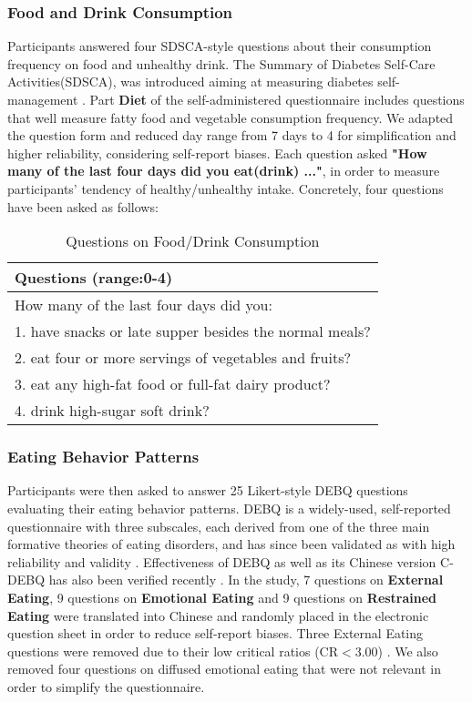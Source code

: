 \documentclass[letterpaper]{article}
\begin{document}
\subsubsection{Food and Drink Consumption}
Participants answered four SDSCA-style questions about their consumption
frequency on food and unhealthy drink. The Summary of Diabetes Self-Care
Activities(SDSCA), was introduced aiming at measuring diabetes self-management \cite{toobert2000summary}.
Part \textbf{Diet} of the self-administered questionnaire includes questions that well measure fatty food and vegetable consumption frequency.
We adapted the question form and reduced day range from 7 days to 4 for simplification and higher reliability, considering self-report biases.
Each question asked \textbf{"How many of the last four days did you eat(drink) ..."}, in order to measure participants' 
tendency of healthy/unhealthy intake. Concretely, four questions have been asked as follows:
\begin{table}[htbp]
    \caption{Questions on Food/Drink Consumption}
    \centering
    \begin{tabular}{l}
        \toprule
        Questions (range:0-4) \\
        \midrule
        How many of the last four days did you: \\
        1. have snacks or late supper besides the normal meals? \\
        2. eat four or more servings of vegetables and fruits? \\
        3. eat any high-fat food or full-fat dairy product? \\
        4. drink high-sugar soft drink? \\
        \bottomrule
    \end{tabular}
\end{table}

\subsubsection{Eating Behavior Patterns}
Participants were then asked to answer 25 Likert-style DEBQ questions evaluating
their eating behavior patterns. DEBQ is a widely-used, self-reported questionnaire with
three subscales\cite{van1986dutch}, each derived from one of the three main formative theories of eating disorders, 
and has since been validated as with high reliability and validity
\cite{van1986predictive,hyland1989psychometric,wardle1987eating,braet1997assessment}.
Effectiveness of DEBQ as well as its Chinese version C-DEBQ has also been verified recently 
\cite{wu2017validation,wang2018psychometric}. In the study, 7 questions on \textbf{External Eating},
9 questions on \textbf{Emotional Eating} and 9 questions on \textbf{Restrained Eating}
were translated into Chinese and randomly placed in the electronic question sheet in order to reduce self-report biases.
Three External Eating questions were removed due to their low critical ratios (CR\( < 3.00\))
\cite{wu2017validation}. We also removed four questions on diffused emotional
eating that were not relevant in order to simplify the questionnaire.
\end{document}
